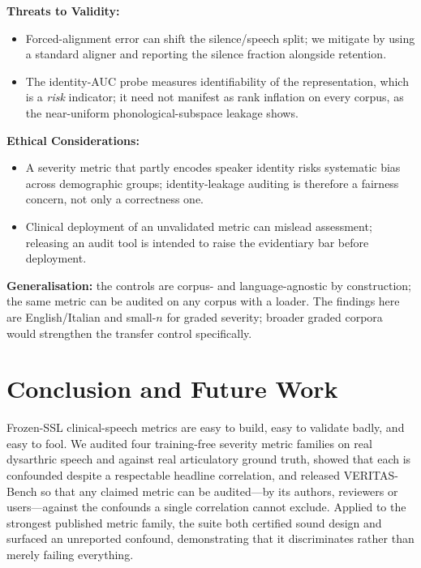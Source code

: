 \documentclass[runningheads]{llncs}
\begin{document}
\textbf{Threats to Validity:}
\begin{itemize}
\item Forced-alignment error can shift the silence/speech split; we mitigate by using a
standard aligner and reporting the silence fraction alongside retention.
\item The identity-AUC probe measures identifiability of the representation, which is a
\emph{risk} indicator; it need not manifest as rank inflation on every corpus, as the
near-uniform phonological-subspace leakage shows.
\end{itemize}

\textbf{Ethical Considerations:}
\begin{itemize}
\item A severity metric that partly encodes speaker identity risks systematic bias
across demographic groups; identity-leakage auditing is therefore a fairness concern,
not only a correctness one.
\item Clinical deployment of an unvalidated metric can mislead assessment; releasing an
audit tool is intended to raise the evidentiary bar before deployment.
\end{itemize}

\textbf{Generalisation:} the controls are corpus- and language-agnostic by construction;
the same metric can be audited on any corpus with a loader. The findings here are
English/Italian and small-$n$ for graded severity; broader graded corpora would
strengthen the transfer control specifically.

\section{Conclusion and Future Work}
Frozen-SSL clinical-speech metrics are easy to build, easy to validate badly, and easy
to fool. We audited four training-free severity metric families on real dysarthric speech
and against real articulatory ground truth, showed that each is confounded despite a
respectable headline correlation, and released VERITAS-Bench so that any claimed metric
can be audited---by its authors, reviewers or users---against the confounds a single
correlation cannot exclude. Applied to the strongest published metric family, the suite
both certified sound design and surfaced an unreported confound, demonstrating that it
discriminates rather than merely failing everything.
\end{document}
